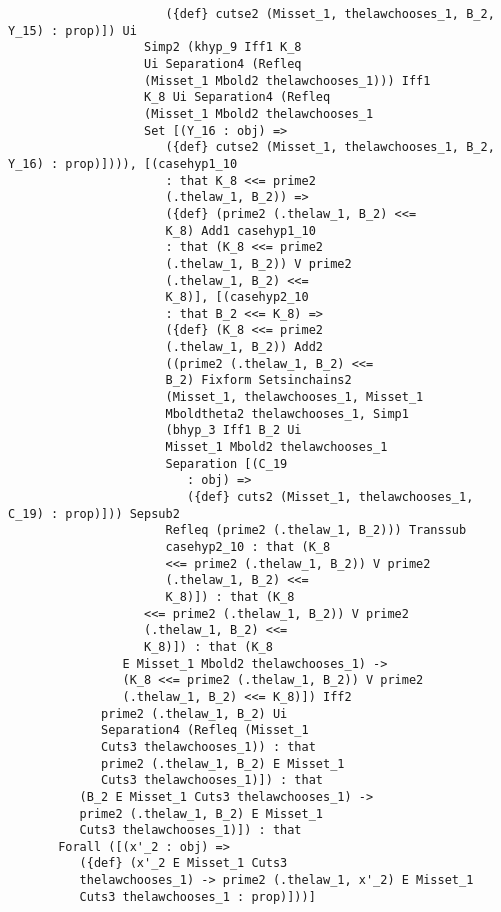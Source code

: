 \documentclass[12pt]{article}
\begin{document}
\begin{verbatim}
                      ({def} cutse2 (Misset_1, thelawchooses_1, B_2, Y_15) : prop)]) Ui 
                   Simp2 (khyp_9 Iff1 K_8 
                   Ui Separation4 (Refleq 
                   (Misset_1 Mbold2 thelawchooses_1))) Iff1 
                   K_8 Ui Separation4 (Refleq 
                   (Misset_1 Mbold2 thelawchooses_1 
                   Set [(Y_16 : obj) => 
                      ({def} cutse2 (Misset_1, thelawchooses_1, B_2, Y_16) : prop)]))), [(casehyp1_10 
                      : that K_8 <<= prime2 
                      (.thelaw_1, B_2)) => 
                      ({def} (prime2 (.thelaw_1, B_2) <<= 
                      K_8) Add1 casehyp1_10 
                      : that (K_8 <<= prime2 
                      (.thelaw_1, B_2)) V prime2 
                      (.thelaw_1, B_2) <<= 
                      K_8)], [(casehyp2_10 
                      : that B_2 <<= K_8) => 
                      ({def} (K_8 <<= prime2 
                      (.thelaw_1, B_2)) Add2 
                      ((prime2 (.thelaw_1, B_2) <<= 
                      B_2) Fixform Setsinchains2 
                      (Misset_1, thelawchooses_1, Misset_1 
                      Mboldtheta2 thelawchooses_1, Simp1 
                      (bhyp_3 Iff1 B_2 Ui 
                      Misset_1 Mbold2 thelawchooses_1 
                      Separation [(C_19 
                         : obj) => 
                         ({def} cuts2 (Misset_1, thelawchooses_1, C_19) : prop)])) Sepsub2 
                      Refleq (prime2 (.thelaw_1, B_2))) Transsub 
                      casehyp2_10 : that (K_8 
                      <<= prime2 (.thelaw_1, B_2)) V prime2 
                      (.thelaw_1, B_2) <<= 
                      K_8)]) : that (K_8 
                   <<= prime2 (.thelaw_1, B_2)) V prime2 
                   (.thelaw_1, B_2) <<= 
                   K_8)]) : that (K_8 
                E Misset_1 Mbold2 thelawchooses_1) -> 
                (K_8 <<= prime2 (.thelaw_1, B_2)) V prime2 
                (.thelaw_1, B_2) <<= K_8)]) Iff2 
             prime2 (.thelaw_1, B_2) Ui 
             Separation4 (Refleq (Misset_1 
             Cuts3 thelawchooses_1)) : that 
             prime2 (.thelaw_1, B_2) E Misset_1 
             Cuts3 thelawchooses_1)]) : that 
          (B_2 E Misset_1 Cuts3 thelawchooses_1) -> 
          prime2 (.thelaw_1, B_2) E Misset_1 
          Cuts3 thelawchooses_1)]) : that 
       Forall ([(x'_2 : obj) => 
          ({def} (x'_2 E Misset_1 Cuts3 
          thelawchooses_1) -> prime2 (.thelaw_1, x'_2) E Misset_1 
          Cuts3 thelawchooses_1 : prop)]))]



\end{verbatim}
\end{document}
